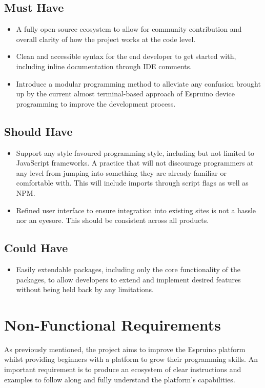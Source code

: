 \documentclass{l4proj}
\begin{document}
\subsection{Must Have}
\begin{itemize}
    \item A fully open-source ecosystem to allow for community contribution and overall clarity of how the project works at the code level.
    \item Clean and accessible syntax for the end developer to get started with, including inline documentation through IDE comments.
    \item Introduce a modular programming method to alleviate any confusion brought up by the current almost terminal-based approach of Espruino device programming to improve the development process.
\end{itemize}
\subsection{Should Have}
\begin{itemize}
    \item Support any style favoured programming style, including but not limited to JavaScript frameworks. A practice that will not discourage programmers at any level from jumping into something they are already familiar or comfortable with. This will include imports through script flags as well as NPM.
    \item Refined user interface to ensure integration into existing sites is not a hassle nor an eyesore. This should be consistent across all products.
\end{itemize}
\subsection{Could Have}
\begin{itemize}
    \item Easily extendable packages, including only the core functionality of the packages, to allow developers to extend and implement desired features without being held back by any limitations.
\end{itemize}
\section{Non-Functional Requirements}
\text As previously mentioned, the project aims to improve the Espruino platform whilst providing beginners with a platform to grow their programming skills. An important requirement is to produce an ecosystem of clear instructions and examples to follow along and fully understand the platform's capabilities.
\end{document}

